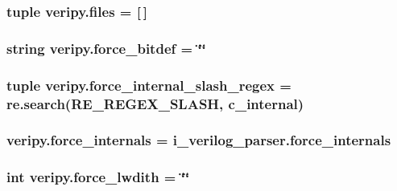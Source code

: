 \hypertarget{namespaceveripy_ab7b6cf37a53cdc1b33b264beff792b41}{
\subsubsection[{files}]{\setlength{\rightskip}{0pt plus 5cm}tuple veripy.\-files = \mbox{[}$\,$\mbox{]}}}\label{namespaceveripy_ab7b6cf37a53cdc1b33b264beff792b41}
\hypertarget{namespaceveripy_a9822bb2309876404c811435995f2d238}{
\subsubsection[{force\-\_\-bitdef}]{\setlength{\rightskip}{0pt plus 5cm}string veripy.\-force\-\_\-bitdef = \char`\"{}\char`\"{}}}\label{namespaceveripy_a9822bb2309876404c811435995f2d238}
\hypertarget{namespaceveripy_a06e433e8b950a487545be60f952e0667}{
\subsubsection[{force\-\_\-internal\-\_\-slash\-\_\-regex}]{\setlength{\rightskip}{0pt plus 5cm}tuple veripy.\-force\-\_\-internal\-\_\-slash\-\_\-regex = re.\-search(R\-E\-\_\-\-R\-E\-G\-E\-X\-\_\-\-S\-L\-A\-S\-H, {\bf c\-\_\-internal})}}\label{namespaceveripy_a06e433e8b950a487545be60f952e0667}
\hypertarget{namespaceveripy_aa1d344d5e238d367dcaf3acb91dbcc6d}{
\subsubsection[{force\-\_\-internals}]{\setlength{\rightskip}{0pt plus 5cm}veripy.\-force\-\_\-internals = i\-\_\-verilog\-\_\-parser.\-force\-\_\-internals}}\label{namespaceveripy_aa1d344d5e238d367dcaf3acb91dbcc6d}
\hypertarget{namespaceveripy_af4d2239bb757aeee622c2066f0d4b766}{
\subsubsection[{force\-\_\-lwdith}]{\setlength{\rightskip}{0pt plus 5cm}int veripy.\-force\-\_\-lwdith = \char`\"{}\char`\"{}}}\label{namespaceveripy_af4d2239bb757aeee622c2066f0d4b766}

